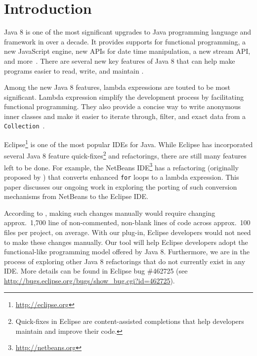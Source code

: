 \section{Introduction}

Java 8 is one of the most significant upgrades to Java programming language
and framework in over a decade. It provides supports for functional
programming, a new JavaScript engine, new APIs for date time manipulation, a
new stream API, and more~\cite{newjdk}. There are several new key features of
Java 8 that can help make programs easier to read, write, and maintain
\cite{gyori2013}.

Among the new Java 8 features, lambda expressions are touted to be most
significant. Lambda expression simplify the development process by
facilitating functional programming. They also provide a concise way to write
anonymous inner classes and make it easier to iterate through, filter, and
exact data from a \lstinline{Collection}~\cite{lambdaqs}.

Eclipse\footnote{\url{http://eclipse.org}} is one of the most popular IDEs for
Java. While Eclipse has incorporated several Java 8 feature
quick-fixes\footnote{Quick-fixes in Eclipse are content-assisted completions
that help developers maintain and improve their code.} and refactorings, there
are still many features left to be done. For example, the NetBeans
IDE\footnote{\url{http://netbeans.org}} has a refactoring (originally proposed
by \citet{gyori2013}) that converts enhanced \lstinline{for} loops to a lambda
expression.  This paper discusses our ongoing work in exploring the porting of
such conversion mechanisms from NetBeans to the Eclipse IDE\@. 

According to \citet{gyori2013}, making such changes manually would require
changing approx.~1,700 line of non-commented, non-blank lines of code across
approx.~100 files per project, on average. With our plug-in, Eclipse
developers would not need to make these changes manually.  Our tool will help
Eclipse developers adopt the functional-like programming model offered by Java
8. Furthermore, we are in the process of exploring other Java 8 refactorings
that do not currently exist in any IDE\@. More details can be found in Eclipse
bug \#462725 (see \url{http://bugs.eclipse.org/bugs/show_bug.cgi?id=462725}).
